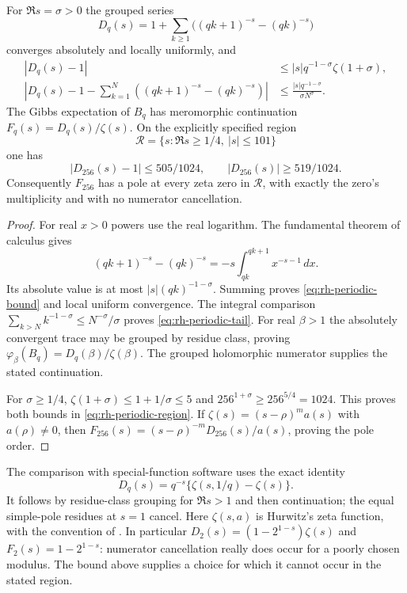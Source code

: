 \begin{proposition}
For $\Re s=\sigma>0$ the grouped series
\begin{equation}
 D_q(s)=1+\sum_{k\ge1}\bigl((qk+1)^{-s}-(qk)^{-s}\bigr)
 \label{eq:rh-periodic-numerator}
\end{equation}
converges absolutely and locally uniformly, and
\begin{align}
 |D_q(s)-1|&\le |s|q^{-1-\sigma}\zeta(1+\sigma),\label{eq:rh-periodic-bound}\\
 \left|D_q(s)-1-\sum_{k=1}^N
 ((qk+1)^{-s}-(qk)^{-s})\right|
 &\le\frac{|s|q^{-1-\sigma}}{\sigma N^\sigma}.
 \label{eq:rh-periodic-tail}
\end{align}
The Gibbs expectation of $B_q$ has meromorphic continuation
$F_q(s)=D_q(s)/\zeta(s)$. On the explicitly specified region
\[
 \mathcal R=\{s:\Re s\ge1/4,\ |s|\le101\}
\]
one has
\begin{equation}
 |D_{256}(s)-1|\le505/1024,\qquad
 |D_{256}(s)|\ge519/1024.
 \label{eq:rh-periodic-region}
\end{equation}
Consequently $F_{256}$ has a pole at every zeta zero in $\mathcal R$,
with exactly the zero's multiplicity and with no numerator cancellation.
\end{proposition}
\begin{proof}
For real $x>0$ powers use the real logarithm. The fundamental theorem
of calculus gives
\[
 (qk+1)^{-s}-(qk)^{-s}
 =-s\int_{qk}^{qk+1}x^{-s-1}\,dx .
\]
Its absolute value is at most $|s|(qk)^{-1-\sigma}$.
Summing proves \eqref{eq:rh-periodic-bound} and local uniform convergence.
The integral comparison
$\sum_{k>N}k^{-1-\sigma}\le N^{-\sigma}/\sigma$
proves \eqref{eq:rh-periodic-tail}.
For real $\beta>1$ the absolutely convergent trace may be grouped by
residue class, proving $\varphi_\beta(B_q)=D_q(\beta)/\zeta(\beta)$.
The grouped holomorphic numerator supplies the stated continuation.

For $\sigma\ge1/4$, $\zeta(1+\sigma)\le1+1/\sigma\le5$ and
$256^{1+\sigma}\ge256^{5/4}=1024$. This proves both bounds in
\eqref{eq:rh-periodic-region}. If
$\zeta(s)=(s-\rho)^m a(s)$ with $a(\rho)\ne0$, then
$F_{256}(s)=(s-\rho)^{-m}D_{256}(s)/a(s)$, proving the pole order.
\end{proof}

The comparison with special-function software uses the exact identity
\[
 D_q(s)=q^{-s}\{\zeta(s,1/q)-\zeta(s)\}.
\]
It follows by residue-class grouping for $\Re s>1$ and then continuation;
the equal simple-pole residues at $s=1$ cancel. Here $\zeta(s,a)$
is Hurwitz's zeta function, with the convention of
\cite[\S25.11(i), (25.11.1)--(25.11.3)]{apostolDLMF25}.
In particular $D_2(s)=(1-2^{1-s})\zeta(s)$ and
$F_2(s)=1-2^{1-s}$: numerator cancellation really does occur for a
poorly chosen modulus. The bound above supplies a choice for which
it cannot occur in the stated region.

